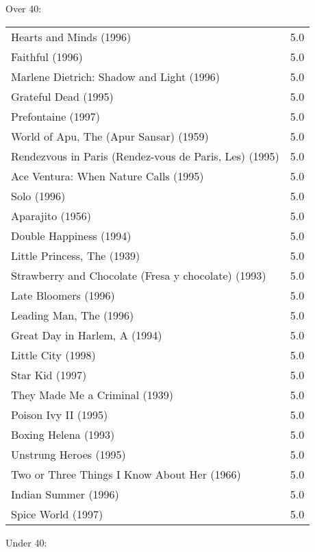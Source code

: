 \documentclass{article}
\begin{document}
Over 40:\\
\begin{tabular}{ l r }
Hearts and Minds (1996)  & 5.0 \\
Faithful (1996)  & 5.0 \\
Marlene Dietrich: Shadow and Light (1996)   & 5.0 \\
Grateful Dead (1995)  & 5.0 \\
Prefontaine (1997)  & 5.0 \\
World of Apu, The (Apur Sansar) (1959)  & 5.0 \\
Rendezvous in Paris (Rendez-vous de Paris, Les) (1995)  & 5.0 \\
Ace Ventura: When Nature Calls (1995)  & 5.0 \\
Solo (1996)  & 5.0 \\
Aparajito (1956)  & 5.0 \\
Double Happiness (1994)  & 5.0 \\
Little Princess, The (1939)  & 5.0 \\
Strawberry and Chocolate (Fresa y chocolate) (1993)  & 5.0 \\
Late Bloomers (1996)  & 5.0 \\
Leading Man, The (1996)  & 5.0 \\
Great Day in Harlem, A (1994)  & 5.0 \\
Little City (1998)  & 5.0 \\
Star Kid (1997)  & 5.0 \\
They Made Me a Criminal (1939)  & 5.0 \\
Poison Ivy II (1995)  & 5.0 \\
Boxing Helena (1993)  & 5.0 \\
Unstrung Heroes (1995)  & 5.0 \\
Two or Three Things I Know About Her (1966)  & 5.0 \\
Indian Summer (1996)  & 5.0 \\
Spice World (1997)  & 5.0 \\
\end{tabular}
\newpage
Under 40:\\
\end{document}

